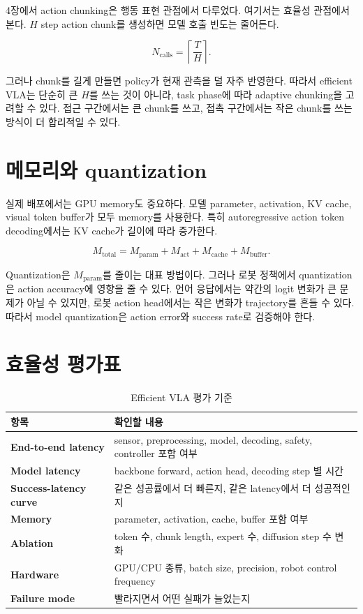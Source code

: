 4장에서 action chunking은 행동 표현 관점에서 다루었다. 여기서는 효율성 관점에서 본다. $H$ step action chunk를 생성하면 모델 호출 빈도는 줄어든다.

\begin{equation}
  N_{\mathrm{calls}}
  =
  \left\lceil
  \frac{T}{H}
  \right\rceil.
\end{equation}

그러나 chunk를 길게 만들면 policy가 현재 관측을 덜 자주 반영한다. 따라서 efficient VLA는 단순히 큰 $H$를 쓰는 것이 아니라, task phase에 따라 adaptive chunking을 고려할 수 있다. 접근 구간에서는 큰 chunk를 쓰고, 접촉 구간에서는 작은 chunk를 쓰는 방식이 더 합리적일 수 있다.

\section{메모리와 quantization}

실제 배포에서는 GPU memory도 중요하다. 모델 parameter, activation, KV cache, visual token buffer가 모두 memory를 사용한다. 특히 autoregressive action token decoding에서는 KV cache가 길이에 따라 증가한다.

\begin{equation}
  M_{\mathrm{total}}
  =
  M_{\mathrm{param}}
  +
  M_{\mathrm{act}}
  +
  M_{\mathrm{cache}}
  +
  M_{\mathrm{buffer}}.
\end{equation}

Quantization은 $M_{\mathrm{param}}$를 줄이는 대표 방법이다. 그러나 로봇 정책에서 quantization은 action accuracy에 영향을 줄 수 있다. 언어 응답에서는 약간의 logit 변화가 큰 문제가 아닐 수 있지만, 로봇 action head에서는 작은 변화가 trajectory를 흔들 수 있다. 따라서 model quantization은 action error와 success rate로 검증해야 한다.

\section{효율성 평가표}

\begin{table}[t]
  \centering
  \caption{Efficient VLA 평가 기준}
  \label{tab:efficient_vla_eval}
  \begin{tabularx}{\textwidth}{>{\bfseries}p{32mm}X}
    \toprule
    항목 & 확인할 내용 \\
    \midrule
    End-to-end latency & sensor, preprocessing, model, decoding, safety, controller 포함 여부 \\
    Model latency & backbone forward, action head, decoding step 별 시간 \\
    Success-latency curve & 같은 성공률에서 더 빠른지, 같은 latency에서 더 성공적인지 \\
    Memory & parameter, activation, cache, buffer 포함 여부 \\
    Ablation & token 수, chunk length, expert 수, diffusion step 수 변화 \\
    Hardware & GPU/CPU 종류, batch size, precision, robot control frequency \\
    Failure mode & 빨라지면서 어떤 실패가 늘었는지 \\
    \bottomrule
  \end{tabularx}
\end{table}

